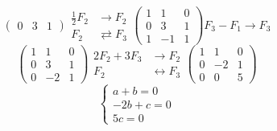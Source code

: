 \documentclass[../practica.root.tex]{subfiles}
\begin{document}
\begin{enumerate}
\begin{enumerate}
\begin{enumerate}
\[\begin{pmatrix}
                                      0 & 3  & 1
                                  \end{pmatrix}
                                  \begin{array}{rl}
                                      \frac{1}{2}F_2 & \to F_2              \\
                                      F_2            & \rightleftarrows F_3
                                  \end{array}
                                  \begin{pmatrix}
                                      1 & 1  & 0 \\
                                      0 & 3  & 1 \\
                                      1 & -1 & 1
                                  \end{pmatrix}
                                  F_3 - F_1 \to F_3
                              \] \[
                                  \begin{pmatrix}
                                      1 & 1  & 0 \\
                                      0 & 3  & 1 \\
                                      0 & -2 & 1
                                  \end{pmatrix}
                                  \begin{array}{rl}
                                      2F_2 + 3F_3 & \to F_2             \\
                                      F_2         & \leftrightarrow F_3
                                  \end{array}
                                  \begin{pmatrix}
                                      1 & 1  & 0 \\
                                      0 & -2 & 1 \\
                                      0 & 0  & 5
                                  \end{pmatrix}
                              \] \[
                                  \begin{cases}
                                      a + b = 0   \\
                                      -2b + c = 0 \\
                                      5c = 0
                                  \end{cases}
\]
\end{enumerate}
\end{enumerate}
\end{enumerate}
\end{document}
